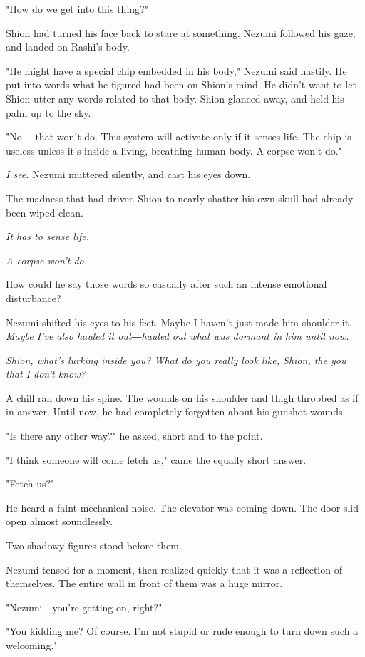 "How do we get into this thing?"

Shion had turned his face back to stare at something. Nezumi followed
his gaze, and landed on Rashi's body.

"He might have a special chip embedded in his body," Nezumi said
hastily. He put into words what he figured had been on Shion's mind. He
didn't want to let Shion utter any words related to that body. Shion
glanced away, and held his palm up to the sky.

"No― that won't do. This system will activate only if it senses life.
The chip is useless unless it's inside a living, breathing human body. A
corpse won't do."

\emph{I see.} Nezumi muttered silently, and cast his eyes down.

The madness that had driven Shion to nearly shatter his own skull had
already been wiped clean.

\emph{It has to sense life.}

\emph{A corpse won't do.}

How could he say those words so casually after such an intense emotional
disturbance?

Nezumi shifted his eyes to his feet. Maybe I haven't just made him
shoulder it. \emph{Maybe I've also hauled it out―hauled out what was dormant
	in him until now.}

\emph{Shion, what's lurking inside you? What do you really look like, Shion,
	the you that I don't know?}

A chill ran down his spine. The wounds on his shoulder and thigh
throbbed as if in answer. Until now, he had completely forgotten about
his gunshot wounds.

"Is there any other way?" he asked, short and to the point.

"I think someone will come fetch us," came the equally short answer.

"Fetch us?"

He heard a faint mechanical noise. The elevator was coming down. The
door slid open almost soundlessly.

Two shadowy figures stood before them.

Nezumi tensed for a moment, then realized quickly that it was a
reflection of themselves. The entire wall in front of them was a huge
mirror.

"Nezumi―you're getting on, right?"

"You kidding me? Of course. I'm not stupid or rude enough to turn down
such a welcoming."

